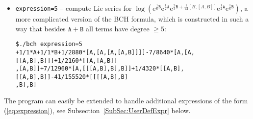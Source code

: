 \documentclass[11pt,a4paper]{article}
\newcommand{\ee}{\mathrm{e}}
\renewcommand{\AA}{\mathtt{A}}
\newcommand{\BB}{\mathtt{B}}
\begin{document}
\begin{itemize}[leftmargin=*]
\item {\tt expression=5} -- compute Lie series for $\log(\ee^{\frac{1}{6}\BB}\ee^{\frac{1}{2}\AA}
\ee^{\frac{2}{3}\BB+\frac{1}{72}[B,[A,B]]}\ee^{\frac{1}{2}\AA}\ee^{\frac{1}{6}\BB})$,
a more complicated version of the BCH formula, which is constructed in such a way that 
besides $\AA+\BB$ all terms have degree $\geq 5$:

{\small\begin{BVerbatim}
$./bch expression=5
+1/1*A+1/1*B+1/2880*[A,[A,[A,[A,B]]]]-7/8640*[A,[A,[[A,B],B]]]+1/2160*[[A,[A,B]]
,[A,B]]+7/12960*[A,[[[A,B],B],B]]+1/4320*[[A,B],[[A,B],B]]-41/155520*[[[[A,B],B]
,B],B]
\end{BVerbatim}
}
\end{itemize}
The program can easily be extended to handle additional expressions
of the form (\ref{eq:expression}), see Subsection~\ref{SubSec:UserDefExpr} below.
\end{document}
